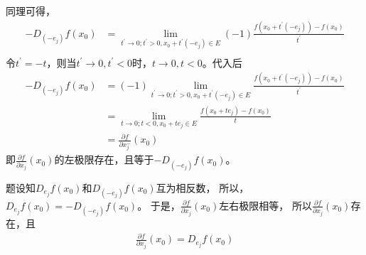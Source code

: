 \documentclass{article}
\begin{document}
\begin{itemize}
        同理可得，
        \begin{align*}
          - D_{(-e_j)} f(x_0) & = \lim\limits_{t^\prime \to 0; t^\prime > 0, x_0 + t^\prime (-e_j) \in E} (-1) \frac{f(x_0 + t^\prime(-e_j)) - f(x_0)}{t^\prime} \\
        \end{align*}
        令$t^\prime = -t$，则当$t^\prime \to 0, t^\prime < 0$时，$t \to 0, t < 0$。代入后
        \begin{align*}
          - D_{(-e_j)} f(x_0) & = (-1) \lim\limits_{t^\prime \to 0; t^\prime > 0, x_0 + t^\prime (-e_j) \in E} \frac{f(x_0 + t^\prime(-e_j)) - f(x_0)}{t^\prime} \\
                              & = \lim\limits_{t \to 0; t < 0, x_0 + te_j \in E} \frac{f(x_0 + te_j) - f(x_0)}{t}                                                \\
                              & = \frac{\partial f}{\partial x_j^-}(x_0)
        \end{align*}
        即$\frac{\partial f}{\partial x_j}(x_0)$的左极限存在，且等于$- D_{(-e_j)} f(x_0)$。

        题设知$D_{e_j}f(x_0)$和$D_{(-e_j)} f(x_0)$互为相反数，
        所以，$D_{e_j}f(x_0) = - D_{(-e_j)} f(x_0)$。
        于是，$\frac{\partial f}{\partial x_j}(x_0)$左右极限相等，
        所以$\frac{\partial f}{\partial x_j}(x_0)$存在，且
        \begin{align*}
          \frac{\partial f}{\partial x_j}(x_0) = D_{e_j}f(x_0)
        \end{align*}

\end{itemize}
\end{document}
